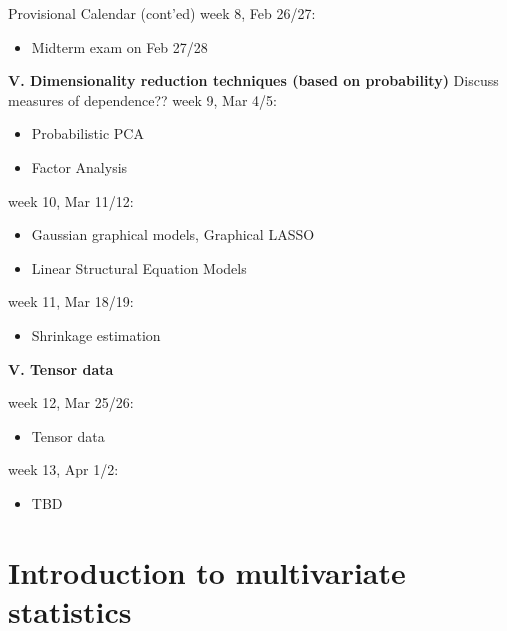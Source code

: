 \documentclass[11pt,handout,aspectratio=169]{beamer}
\begin{document}
\begin{frame}
{Provisional Calendar (cont'ed) }
\small
week 8,  Feb 26/27:\\[-1mm]
  \begin{itemize}
  \item \alert{Midterm exam on Feb 27/28}
\end{itemize}

\noindent \textbf{V. Dimensionality reduction techniques (based on probability)}
\alert{Discuss measures of dependence??}
week 9, Mar 4/5:\\[-1mm]
\begin{itemize}
\item Probabilistic PCA
\item Factor Analysis
\end{itemize}

week 10, Mar 11/12:\\[-1mm]
\begin{itemize}
\item Gaussian graphical models, Graphical LASSO
\item Linear Structural Equation Models
\end{itemize}

week 11, Mar 18/19:\\[-1mm]
\begin{itemize}
\item Shrinkage estimation
\end{itemize}

\noindent \textbf{V. Tensor data}

week 12, Mar 25/26:\\[-1mm]
\begin{itemize}
\item Tensor data
\end{itemize}

 week 13, Apr 1/2:\\[-1mm]
\begin{itemize} 
\item TBD
\end{itemize}
\end{frame}

\section{Introduction to multivariate statistics}
\end{document}
